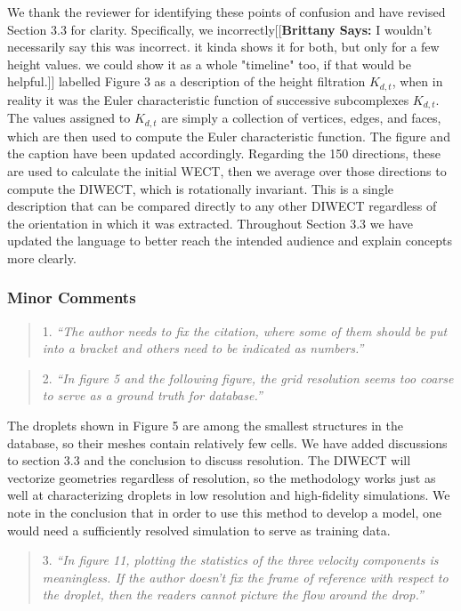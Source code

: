 \documentclass[11pt]{article}
\newcommand{\payAttention}[3]{{\color{#1}[[\textbf{#2: }#3]]}}
\newcommand{\xSays}[3]{\payAttention{#1}{#2 Says}{#3}}
\newcommand{\brittany}[1]{\xSays{blue}{Brittany}{#1}}
\begin{document}
We thank the reviewer for identifying these points of confusion and have revised
Section 3.3 for clarity. Specifically, we incorrectly\brittany{I wouldn't
necessarily say this was incorrect. it kinda shows it for both, but only for a
few height values.  we could show it as a whole "timeline" too, if that would be
helpful.}
labelled Figure 3 as a description of the height filtration $K_{d,t}$, when in reality it was the Euler characteristic function of successive subcomplexes $K_{d,t}$. The values assigned to $K_{d,t}$ are simply a collection of vertices, edges, and faces, which are then used to compute the Euler characteristic function. The figure and the caption have been updated accordingly. Regarding the 150 directions, these are used to calculate the initial WECT, then we average over those directions to compute the DIWECT, which is rotationally invariant. This is a single description that can be compared directly to any other DIWECT regardless of the orientation in which it was extracted. Throughout Section 3.3 we have updated the language to better reach the intended audience and explain concepts more clearly.

\subsubsection*{Minor Comments}
\begin{quote}
    {1. \it``The author needs to fix the citation, where some of them should be put into a bracket and others need to be indicated as numbers.''}
\end{quote}

\begin{quote}
    {2. \it``In figure 5 and the following figure, the grid resolution seems too coarse to serve as a ground truth for database.''}
\end{quote}

The droplets shown in Figure 5 are among the smallest structures in the database, so their meshes contain relatively few cells. We have added discussions to section 3.3 and the conclusion to discuss resolution. The DIWECT will vectorize geometries regardless of resolution, so the methodology works just as well at characterizing droplets in low resolution and high-fidelity simulations. We note in the conclusion that in order to use this method to develop a model, one would need a sufficiently resolved simulation to serve as training data.

\begin{quote}
    {3. \it``In figure 11, plotting the statistics of the three velocity components is meaningless. If the author doesn't fix the frame of reference with respect to the droplet, then the readers cannot picture the flow around the drop.''}
\end{quote}
\end{document}

